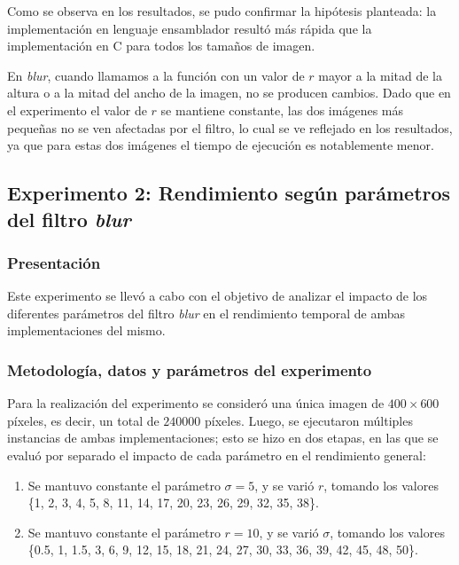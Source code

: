              Como se observa en los resultados, se pudo confirmar la hipótesis planteada: la implementación en lenguaje ensamblador resultó más rápida que la implementación en C para todos los tamaños de imagen.

             En \emph{blur}, cuando llamamos a la función con un valor de $r$ mayor a la mitad de la altura o a la mitad del ancho de la imagen, no se producen cambios. Dado que en el experimento el valor de $r$ se mantiene constante, las dos imágenes más pequeñas no se ven afectadas por el filtro, lo cual se ve reflejado en los resultados, ya que para estas dos imágenes el tiempo de ejecución es notablemente menor.

    \subsection{Experimento 2: Rendimiento según parámetros del filtro \emph{blur}}

        \subsubsection*{Presentación}
            Este experimento se llevó a cabo con el objetivo de analizar el impacto de los diferentes parámetros del filtro \emph{blur} en el rendimiento temporal de ambas implementaciones del mismo.

        \subsubsection*{Metodología, datos y parámetros del experimento}
            Para la realización del experimento se consideró una única imagen de $400 \times 600$ píxeles, es decir, un total de $240000$ píxeles. Luego, se ejecutaron múltiples instancias de ambas implementaciones; esto se hizo en dos etapas, en las que se evaluó por separado el impacto de cada parámetro en el rendimiento general:
            \begin{enumerate}[label=(\alph*)]
                 \item Se mantuvo constante el parámetro $\sigma = 5$, y se varió $r$, tomando los valores \{1, 2, 3, 4, 5, 8, 11, 14, 17, 20, 23, 26, 29, 32, 35, 38\}.
                 \item Se mantuvo constante el parámetro $r = 10$, y se varió $\sigma$, tomando los valores \{0.5, 1, 1.5, 3, 6, 9, 12, 15, 18, 21, 24, 27, 30, 33, 36, 39, 42, 45, 48, 50\}.
             \end{enumerate}

